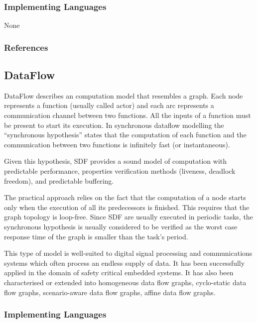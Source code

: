 \subsubsection{Implementing Languages}

None


\subsubsection{References}

\subsection{DataFlow}
\label{subsecF:DataFlow}

DataFlow describes an computation model that resembles a graph. Each node represents a function (usually called actor) and each arc represents a communication channel between two functions. All the inputs of a function must be present to start its execution. In synchronous dataflow modelling the ``synchronous hypothesis'' states that the computation of each function and the communication between two functions is infinitely fast (or instantaneous). 

Given this hypothesis, SDF provides a sound model of computation with predictable performance, properties verification methods (liveness, deadlock freedom), and predictable buffering.

The practical approach relies on the fact that the computation of a node starts only when the execution of all its predecessors is finished. This requires that the graph topology is loop-free. Since SDF are usually executed in periodic tasks, the synchronous hypothesis is usually considered to be verified as the worst case response time of the graph is smaller than the task's period.

This type of model is well-suited to digital signal processing and communications systems which often process an endless supply of data. It has been successfully applied in the domain of safety critical embedded systems. It has also been characterised or extended into homogeneous data flow graphs, cyclo-static data flow graphs, scenario-aware data flow graphs, affine data flow graphs.

\subsubsection{Implementing Languages}

